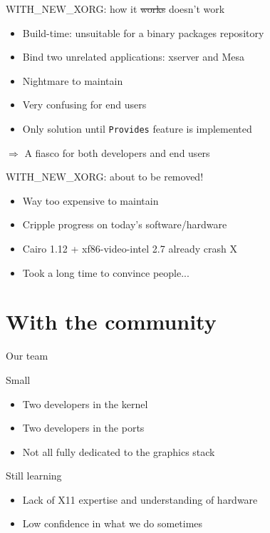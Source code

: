 \documentclass{beamer}
\begin{document}
\begin{frame}{WITH\_NEW\_XORG: how it \st{works} doesn't work}
  \begin{itemize}
    \item Build-time: unsuitable for a binary packages repository
      \pause
    \item Bind two unrelated applications: xserver and Mesa
      \pause
    \item Nightmare to maintain
      \pause
    \item Very confusing for end users
      \pause
    \item Only solution until \texttt{Provides} feature is implemented
  \end{itemize}
  $\Rightarrow$ A fiasco for both developers and end users
\end{frame}

\begin{frame}{WITH\_NEW\_XORG: about to be removed!}
  \begin{itemize}
    \item Way too expensive to maintain
    \item Cripple progress on today's software/hardware
    \item Cairo 1.12 + xf86-video-intel 2.7 already crash X
    \item Took a long time to convince people...
  \end{itemize}
\end{frame}

\section{With the community}

\begin{frame}{Our team}
  \begin{block}{Small}
    \begin{itemize}
      \item Two developers in the kernel
      \item Two developers in the ports
      \item Not all fully dedicated to the graphics stack
    \end{itemize}
  \end{block}
  \begin{block}{Still learning}
    \begin{itemize}
      \item Lack of X11 expertise and understanding of hardware
      \item Low confidence in what we do sometimes
    \end{itemize}
  \end{block}
\end{frame}
\end{document}
